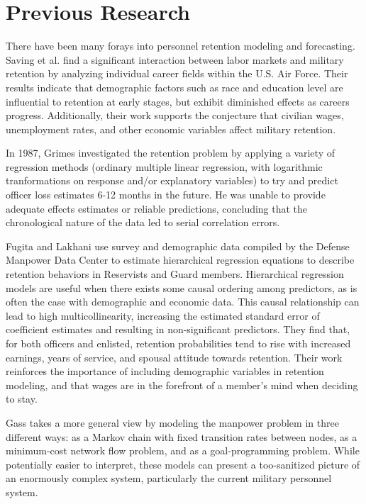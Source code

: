 \documentclass[12pt,letterpaper,toc=flat,oneside]{report}
\theoremstyle{definition}
\theoremstyle{definition}
\theoremstyle{definition}
\theoremstyle{remark}
\begin{document}
\hypertarget{previous-research}{%
\section{Previous Research}\label{previous-research}}

There have been many forays into personnel retention modeling and
forecasting. Saving et al. \cite{saving-etal-1985} find a significant
interaction between labor markets and military retention by analyzing
individual career fields within the U.S. Air Force. Their results
indicate that demographic factors such as race and education level are
influential to retention at early stages, but exhibit diminished effects
as careers progress. Additionally, their work supports the conjecture
that civilian wages, unemployment rates, and other economic variables
affect military retention.

In 1987, Grimes \cite{grimes-1987} investigated the retention problem by
applying a variety of regression methods (ordinary multiple linear
regression, with logarithmic tranformations on response and/or
explanatory variables) to try and predict officer loss estimates 6-12
months in the future. He was unable to provide adequate effects
estimates or reliable predictions, concluding that the chronological
nature of the data led to serial correlation errors.

Fugita and Lakhani \cite{fugita-lakhani-1991} use survey and demographic
data compiled by the Defense Manpower Data Center to estimate
hierarchical regression equations to describe retention behaviors in
Reservists and Guard members. Hierarchical regression models are useful
when there exists some causal ordering among predictors, as is often the
case with demographic and economic data. This causal relationship can
lead to high multicollinearity, increasing the estimated standard error
of coefficient estimates and resulting in non-significant predictors.
They find that, for both officers and enlisted, retention probabilities
tend to rise with increased earnings, years of service, and spousal
attitude towards retention. Their work reinforces the importance of
including demographic variables in retention modeling, and that wages
are in the forefront of a member's mind when deciding to stay.

Gass \cite{gass-1991} takes a more general view by modeling the manpower
problem in three different ways: as a Markov chain with fixed transition
rates between nodes, as a minimum-cost network flow problem, and as a
goal-programming problem. While potentially easier to interpret, these
models can present a too-sanitized picture of an enormously complex
system, particularly the current military personnel system.
\end{document}
